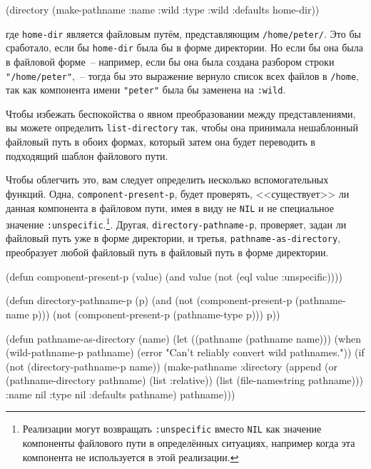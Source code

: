 \begin{myverb}
(directory (make-pathname :name :wild :type :wild :defaults home-dir))
\end{myverb}

\noindent{}где \lstinline{home-dir} является файловым путём, представляющим \lstinline{/home/peter/}. Это бы
сработало, если бы \lstinline{home-dir} была бы в форме директории. Но если бы она была в
файловой форме~-- например, если бы она была создана разбором строки
\lstinline{"/home/peter"},~-- тогда бы это выражение вернуло список всех файлов в
\lstinline{/home}, так как компонента имени \lstinline{"peter"} была бы заменена на
\lstinline{:wild}.

Чтобы избежать беспокойства о явном преобразовании между представлениями, вы можете
определить \lstinline{list-directory} так, чтобы она принимала нешаблонный файловый путь в
обоих формах, который затем она будет переводить в подходящий шаблон файлового пути.

Чтобы облегчить это, вам следует определить несколько вспомогательных функций. Одна,
\lstinline{component-present-p}, будет проверять, <<существует>> ли данная компонента в
файловом пути, имея в виду не \lstinline{NIL} и не специальное значение
\lstinline{:unspecific}.\footnote{Реализации могут возвращать \lstinline{:unspecific}
  вместо \lstinline{NIL} как значение компоненты файлового пути в определённых ситуациях,
  например когда эта компонента не используется в этой реализации.}. Другая,
\lstinline{directory-pathname-p}, проверяет, задан ли файловый путь уже в форме
директории, и \mbox{третья}, \lstinline{pathname-as-directory}, преобразует любой файловый
путь в файловый путь в форме директории.

\begin{myverb}
(defun component-present-p (value)
  (and value (not (eql value :unspecific))))

(defun directory-pathname-p  (p)
  (and
   (not (component-present-p (pathname-name p)))
   (not (component-present-p (pathname-type p)))
   p))

(defun pathname-as-directory (name)
  (let ((pathname (pathname name)))
    (when (wild-pathname-p pathname)
      (error "Can't reliably convert wild pathnames."))
    (if (not (directory-pathname-p name))
      (make-pathname
       :directory (append (or (pathname-directory pathname) (list :relative))
                          (list (file-namestring pathname)))
       :name      nil
       :type      nil
       :defaults pathname)
      pathname)))
\end{myverb}

